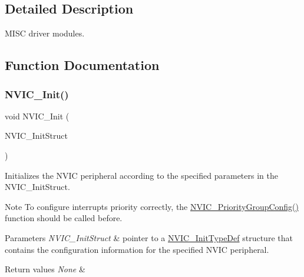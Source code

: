 \subsection{Detailed Description}
M\+I\+SC driver modules. 



\subsection{Function Documentation}
\mbox{\label{group___m_i_s_c_ga4ab373ed0870c06fca5eb51d639adf41}} 
\subsubsection{\texorpdfstring{N\+V\+I\+C\+\_\+\+Init()}{NVIC\_Init()}}
{\footnotesize\ttfamily void N\+V\+I\+C\+\_\+\+Init (\begin{DoxyParamCaption}\item[{\hyperlink{struct_n_v_i_c___init_type_def}{N\+V\+I\+C\+\_\+\+Init\+Type\+Def} $\ast$}]{N\+V\+I\+C\+\_\+\+Init\+Struct }\end{DoxyParamCaption})}



Initializes the N\+V\+IC peripheral according to the specified parameters in the N\+V\+I\+C\+\_\+\+Init\+Struct. 

\begin{DoxyNote}{Note}
To configure interrupts priority correctly, the \hyperlink{group___m_i_s_c___private___functions_gadfb1f34f803ce54c976643db8c484442}{N\+V\+I\+C\+\_\+\+Priority\+Group\+Config()} function should be called before. 
\end{DoxyNote}

\begin{DoxyParams}{Parameters}
{\em N\+V\+I\+C\+\_\+\+Init\+Struct} & pointer to a \hyperlink{struct_n_v_i_c___init_type_def}{N\+V\+I\+C\+\_\+\+Init\+Type\+Def} structure that contains the configuration information for the specified N\+V\+IC peripheral. \\
\hline
\end{DoxyParams}

\begin{DoxyRetVals}{Return values}
{\em None} & \\
\hline
\end{DoxyRetVals}


